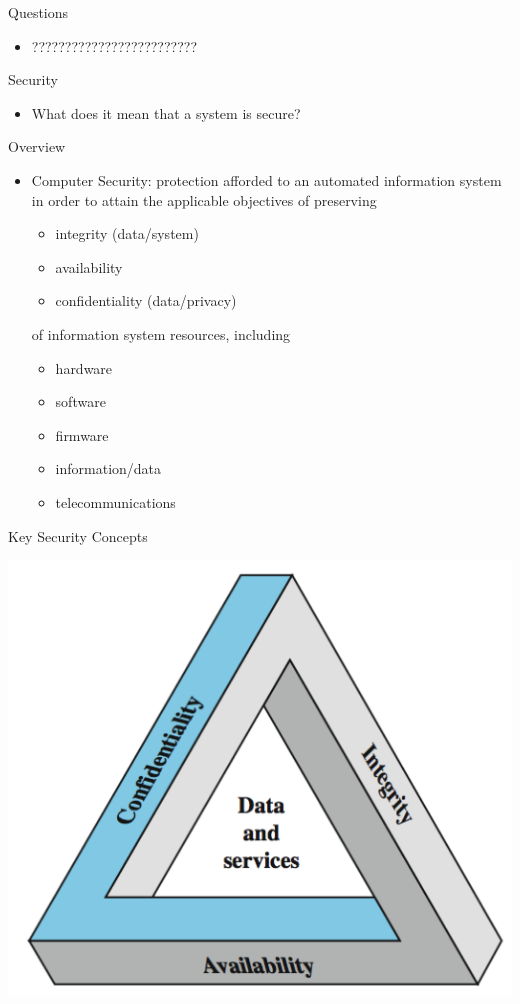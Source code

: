 \documentclass{beamer}
\begin{document}
\begin{frame}{Questions}
  \begin{itemize}
  \item ?????????????????????????
  \end{itemize}
\end{frame}



\begin{frame}{Security}
  \begin{itemize}
  \item What does it mean that a system is secure?
  \end{itemize}
\end{frame}

\begin{frame}{Overview}
  \begin{itemize}
  \item \alert{Computer Security}: protection afforded to an 
    automated information system in order to attain 
    the applicable objectives of preserving
    
    \begin{itemize}
    \item integrity (data/system)
    \item availability
    \item confidentiality (data/privacy)
    \end{itemize}
of  information system resources, including
 
\begin{itemize}
  \item hardware
  \item software
  \item firmware
  \item information/data
  \item telecommunications
\end{itemize}
  \end{itemize}
\end{frame}


\begin{frame}{Key Security Concepts}
  \begin{center}
    \includegraphics[width=0.7\linewidth]{concepts}
  \end{center}
\end{frame}
\end{document}
